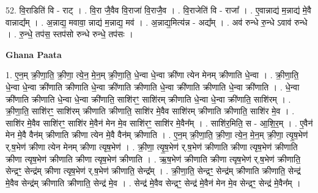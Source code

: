 \documentclass[17pt]{extarticle}
\begin{document}
52. वि॒राडिति॑ वि - राट् । . वि॒रा जै॒वैव वि॒राजा॑ वि॒राजै॒व । . वि॒राजेति॑ वि - राजा᳚ । . ए॒वान्नाद्य॑ म॒न्नाद्य॑ मे॒वै वान्नाद्य᳚म् । . अ॒न्नाद्य॒ मवावा॒ न्नाद्य॑ म॒न्नाद्य॒ मव॑ । . अ॒न्नाद्य॒मित्य॑न्न - अद्य᳚म् । . अव॑ रुन्धे रु॒न्धे ऽवाव॑ रुन्धे । . रु॒न्धे॒ तप॑स॒ स्तप॑सो रुन्धे रुन्धे॒ तप॑सः । \newline

\textbf{Ghana Paata } \newline

1. ए॒न॒म् क्री॒णा॒ति॒ क्री॒णा॒ त्ये॒न॒ मे॒न॒म् क्री॒णा॒ति॒ धे॒न्वा धे॒न्वा क्री॑णा त्येन मेनम् क्रीणाति धे॒न्वा । . क्री॒णा॒ति॒ धे॒न्वा धे॒न्वा क्री॑णाति क्रीणाति धे॒न्वा क्री॑णाति क्रीणाति धे॒न्वा क्री॑णाति क्रीणाति धे॒न्वा क्री॑णाति । . धे॒न्वा क्री॑णाति क्रीणाति धे॒न्वा धे॒न्वा क्री॑णाति॒ साशि॑रꣳ॒॒ साशि॑रम् क्रीणाति धे॒न्वा धे॒न्वा क्री॑णाति॒ साशि॑रम् । . क्री॒णा॒ति॒ साशि॑रꣳ॒॒ साशि॑रम् क्रीणाति क्रीणाति॒ साशि॑र मे॒वैव साशि॑रम् क्रीणाति क्रीणाति॒ साशि॑र मे॒व । . साशि॑र मे॒वैव साशि॑रꣳ॒॒ साशि॑र मे॒वैन॑ मेन मे॒व साशि॑रꣳ॒॒ साशि॑र मे॒वैन᳚म् । . साशि॑र॒मिति॒ स - आ॒शि॒र॒म् । . ए॒वैन॑ मेन मे॒वै वैन॑म् क्रीणाति क्रीणा त्येन मे॒वै वैन॑म् क्रीणाति । . ए॒न॒म् क्री॒णा॒ति॒ क्री॒णा॒ त्ये॒न॒ मे॒न॒म् क्री॒णा॒ त्यृ॒ष॒भेण॑ र्.ष॒भेण॑ क्रीणा त्येन मेनम् क्रीणा त्यृष॒भेण॑ । . क्री॒णा॒ त्यृ॒ष॒भेण॑ र्.ष॒भेण॑ क्रीणाति क्रीणा त्यृष॒भेण॑ क्रीणाति क्रीणा त्यृष॒भेण॑ क्रीणाति क्रीणा त्यृष॒भेण॑ क्रीणाति । . ऋ॒ष॒भेण॑ क्रीणाति क्रीणा त्यृष॒भेण॑ र्.ष॒भेण॑ क्रीणाति॒ सेन्द्रꣳ॒॒ सेन्द्र॑म् क्रीणा त्यृष॒भेण॑ र्.ष॒भेण॑ क्रीणाति॒ सेन्द्र᳚म् । . क्री॒णा॒ति॒ सेन्द्रꣳ॒॒ सेन्द्र॑म् क्रीणाति क्रीणाति॒ सेन्द्र॑ मे॒वैव सेन्द्र॑म् क्रीणाति क्रीणाति॒ सेन्द्र॑ मे॒व । . सेन्द्र॑ मे॒वैव सेन्द्रꣳ॒॒ सेन्द्र॑ मे॒वैन॑ मेन मे॒व सेन्द्रꣳ॒॒ सेन्द्र॑ मे॒वैन᳚म् । \newline
\end{document}
